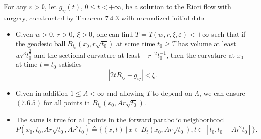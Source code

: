 \begin{lemma}
  \label{lem:cz-large-time-local-curvature-alternatives}

For any $\varepsilon > 0$, let $g_{ij}(t)$, $0 \leq t < +\infty$,
be a solution to the Ricci flow with surgery, constructed by
Theorem $7.4.3$ with normalized initial data.
\begin{itemize}
\item[(i)] Given $w>0$, $r>0$, $\xi>0$, one can find
$T=T(w,r,\xi,\varepsilon)<+\infty$ such that if the geodesic ball
$B_{t_0}(x_0,r\sqrt{t_0})$ at some time $t_0\geq T$ has volume at
least $w r^3t^{\frac{3}{2}}_0$ and the sectional curvature at
least $-r^{-2}t^{-1}_0$, then the curvature at $x_0$ at time
$t=t_0$ satisfies \begin{equation}
|2tR_{ij}+g_{ij}|<\xi. %
\end{equation} \item[(ii)] Given in addition $1 \leq A<\infty$ and allowing
$T$ to depend on $A$, we can ensure $(7.6.5)$ for all points in
$B_{t_0}(x_0,Ar\sqrt{t_0})$. \item[(iii)] The same is true for all
points in the forward parabolic neighborhood
$P(x_0,t_0,Ar\sqrt{t_0},Ar^2t_0)\triangleq\{(x,t)\ |\ x\in
B_t(x_0,Ar\sqrt{t_0}),t\in[t_0,t_0+Ar^2t_0]\}.$
\end{itemize}
\end{lemma}
